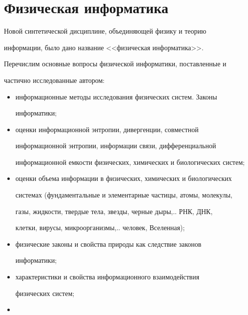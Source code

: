      


\section{Физическая информатика}





   Новой синтетической дисциплине, объединяющей физику и теорию 


информации, было дано название <<физическая информатика>>. 


Перечислим основные вопросы физической информатики, поставленные и 


частично исследованные автором:


\begin{itemize}


\item    


   информационные методы исследования физических систем. Законы 


информатики;


   \item 


   оценки информационной энтропии, дивергенции, совместной 


информационной энтропии, информации связи, дифференциальной 


информационной емкости физических, химических и биологических систем;


   \item 


   оценки объема информации в физических, химических и биологических 


системах (фундаментальные и элементарные частицы, атомы, молекулы, 


газы, жидкости, твердые тела, звезды, черные дыры,.. РНК, ДНК, 


клетки, вирусы, микроорганизмы,.. человек, Вселенная);


   \item 


   физические законы и свойства природы как следствие законов 


информатики;


   \item 


   характеристики и свойства информационного взаимодействия 


физических систем;


   \item 



\end{itemize}
